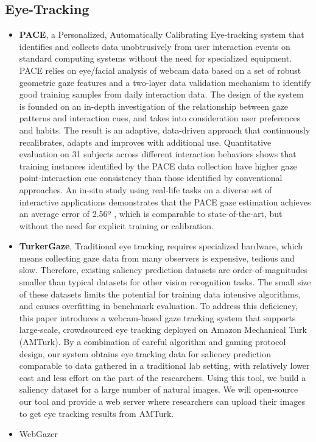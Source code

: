 \documentclass[a4paper,12pt,oneside]{article}
\begin{document}
\subsection{Eye-Tracking}
    \begin{itemize} 
        \item \textbf{PACE}, a Personalized, Automatically Calibrating Eye-tracking system that identifies and collects data unobtrusively from user interaction events on standard computing systems without the need for specialized equipment. PACE relies on eye/facial analysis of webcam data based on a set of robust geometric gaze features and a two-layer data validation mechanism to identify good training samples from daily interaction data. The design of the system is founded on an in-depth investigation of the relationship between gaze patterns and interaction cues, and takes into consideration user preferences and habits. The result is an adaptive, data-driven approach that continuously recalibrates, adapts and improves with additional use. Quantitative evaluation on 31 subjects across different interaction behaviors shows that training instances identified by the PACE data collection have higher gaze point-interaction cue consistency than those identified by conventional approaches. An in-situ study using real-life tasks on a diverse set of interactive applications demonstrates that the PACE gaze estimation achieves an average error of 2.56º , which is comparable to state-of-the-art, but without the need for explicit training or calibration.
        \item \textbf{TurkerGaze}, 
        Traditional eye tracking requires specialized hardware, which means collecting gaze data from many observers is expensive, tedious and slow. Therefore, existing saliency prediction datasets are order-of-magnitudes smaller than typical datasets for other vision recognition tasks. The small size of these datasets limits the potential for training data intensive algorithms, and causes overfitting in benchmark evaluation. To address this deficiency, this paper introduces a webcam-based gaze tracking system that supports large-scale, crowdsourced eye tracking deployed on Amazon Mechanical Turk (AMTurk). By a combination of careful algorithm and gaming protocol design, our system obtains eye tracking data for saliency prediction comparable to data gathered in a traditional lab setting, with relatively lower cost and less effort on the part of the researchers. Using this tool, we build a saliency dataset for a large number of natural images. We will open-source our tool and provide a web server where researchers can upload their images to get eye tracking results from AMTurk.
        \item WebGazer
    \end{itemize}
\end{document}
